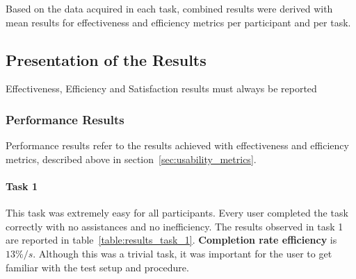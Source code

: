 \documentclass[a4paper]{article}
\begin{document}
  Based on the data acquired in each task, combined results were derived with mean results for effectiveness and efficiency metrics per participant and per task.
  
\subsection{Presentation of the Results}
   Effectiveness, Efficiency and Satisfaction results must always be reported

\subsubsection{Performance Results}
 Performance results refer to the results achieved with effectiveness and efficiency metrics, described above in section~\ref{sec:usability_metrics}.
 \paragraph{Task 1} This task was extremely easy for all participants. Every user completed the task correctly with no assistances and no inefficiency. The results observed in task 1 are reported in table~\ref{table:results_task_1}. \textbf{Completion rate efficiency} is $13\%/s$. Although this was a trivial task, it was important for the user to get familiar with the test setup and procedure.
 
\end{document}
